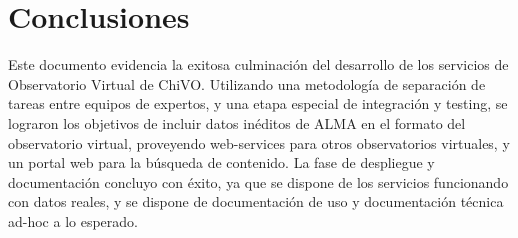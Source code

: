 \section{Conclusiones}

Este documento evidencia la exitosa culminación del desarrollo de los
servicios de Observatorio Virtual de ChiVO. Utilizando una metodología
de separación de tareas entre equipos de expertos, y una etapa especial
de integración y testing, se lograron los objetivos de incluir datos
inéditos de ALMA en el formato del observatorio virtual, proveyendo 
web-services para otros observatorios virtuales, y un portal web
para la búsqueda de contenido.
La fase de despliegue y documentación concluyo con éxito, ya que
se dispone de los servicios funcionando con datos reales, y se
dispone de documentación de uso y documentación técnica ad-hoc a
lo esperado.
